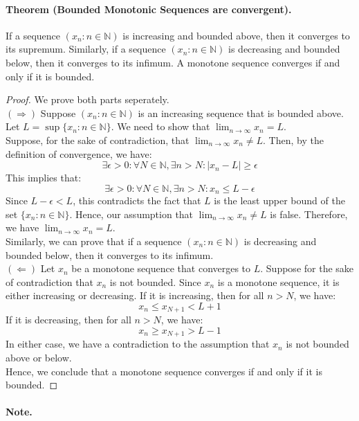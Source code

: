 \documentclass[openany]{book}
\numberwithin{equation}{section}
\begin{document}
\paragraph{Theorem (Bounded Monotonic Sequences are convergent).}

    If a sequence $(x_n : n \in \mathbb{N})$ is increasing and bounded above, then it converges to its supremum. Similarly, if a sequence $(x_n : n \in \mathbb{N})$ is decreasing and bounded below, then it converges to its infimum. A monotone sequence converges if and only if it is bounded.
\par
\begin{proof}
    We prove both parts seperately. \\
    $(\Rightarrow)$ Suppose $(x_n : n \in \mathbb{N})$ is an increasing sequence that is bounded above. Let $L = \sup\{x_n : n \in \mathbb{N}\}$. We need to show that $\lim_{n \to \infty} x_n = L$. \\
    Suppose, for the sake of contradiction, that $\lim_{n \to \infty} x_n \neq L$. Then, by the definition of convergence, we have:
    $$\exists \epsilon > 0: \forall N \in \mathbb{N}, \exists n > N: |x_n - L| \geq \epsilon$$
    This implies that:
    $$\exists \epsilon > 0: \forall N \in \mathbb{N}, \exists n > N: x_n \leq L - \epsilon$$
    Since $L - \epsilon < L$, this contradicts the fact that $L$ is the least upper bound of the set $\{x_n : n \in \mathbb{N}\}$. Hence, our assumption that $\lim_{n \to \infty} x_n \neq L$ is false. Therefore, we have $\lim_{n \to \infty} x_n = L$. \\
    Similarly, we can prove that if a sequence $(x_n : n \in \mathbb{N})$ is decreasing and bounded below, then it converges to its infimum. \\
    $(\Leftarrow)$ Let $x_n$ be a monotone sequence that converges to $L$. Suppose for the sake of contradiction that $x_n$ is not bounded. 
    Since $x_n$ is a monotone sequence, it is either increasing or decreasing. If it is increasing, then for all $n > N$, we have:
    $$x_n \leq x_{N+1} < L + 1$$
    If it is decreasing, then for all $n > N$, we have:
    $$x_n \geq x_{N+1} > L - 1$$
    In either case, we have a contradiction to the assumption that $x_n$ is not bounded above or below. \\
    Hence, we conclude that a monotone sequence converges if and only if it is bounded.
\end{proof}
\paragraph{Note.}
\end{document}
